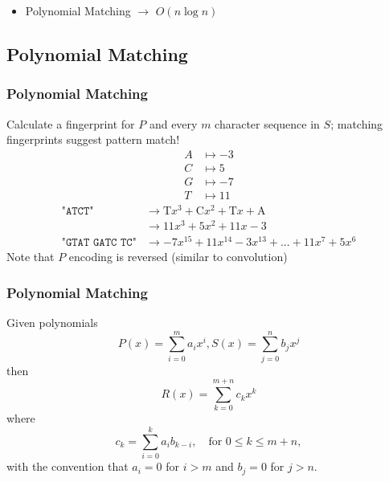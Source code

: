 \documentclass[
	11pt, %
]{beamer}
\begin{document}
\begin{frame}
\begin{center}

    \end{center}

    \begin{itemize}
        \item \alert{Polynomial Matching} $\longrightarrow$ $O(n\log n)$
    \end{itemize}
\end{frame}



\subsection{Polynomial Matching}
\begin{frame}
    \frametitle{Polynomial Matching}
    Calculate a fingerprint for $P$ and every $m$ character sequence in $S$; \alert {matching fingerprints} suggest pattern match!
    \bigskip
    \begin{align*}
        A & \mapsto -3 \\
        C & \mapsto 5  \\
        G & \mapsto -7 \\
        T & \mapsto 11
    \end{align*}
    \begin{align*}
        \texttt{"ATCT"}         & \longrightarrow \text{T}x^3 + \text{C}x^2 + \text{T}x + \text{A}   \\
                                & \longrightarrow  11x^3 + 5x^2 + 11x - 3                            \\
        \texttt{"GTAT GATC TC"} & \longrightarrow -7x^{15} + 11x^{14} - 3x^{13} + ... + 11x^7 + 5x^6
    \end{align*}
    Note that $P$ encoding is reversed (similar to convolution)
\end{frame}


\begin{frame}
    \frametitle{Polynomial Matching}
    Given polynomials
    \[
        P(x) = \sum_{i=0}^{m} a_i x^i, S(x) = \sum_{j=0}^{n} b_j x^j
    \]
    then
    \[
        R(x) = \sum_{k=0}^{m+n} c_k x^k
    \]
    where
    \[
        c_k = \sum_{i=0}^{k} a_i b_{k-i}, \quad \text{for } 0 \leq k \leq m+n,
    \]
    with the convention that \( a_i = 0 \) for \( i > m \) and \( b_j = 0 \) for \( j > n \).
\end{frame}
\end{document}
